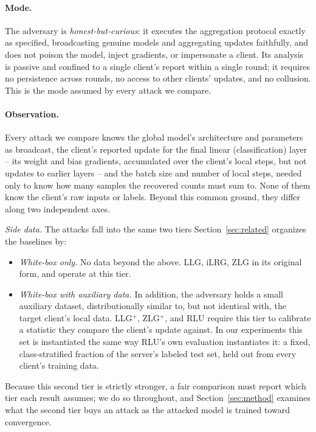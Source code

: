 \paragraph{Mode.}
The adversary is \emph{honest-but-curious}: it executes the aggregation
protocol exactly as specified, broadcasting genuine models and aggregating
updates faithfully, and does not poison the model, inject gradients, or
impersonate a client. Its analysis is passive and confined to a single
client's report within a single round; it requires no persistence across
rounds, no access to other clients' updates, and no collusion. This is the
mode assumed by every attack we compare.

\paragraph{Observation.}
Every attack we compare knows the global model's architecture and
parameters as broadcast, the client's reported update for the final
linear (classification) layer -- its weight and bias gradients,
accumulated over the client's local steps, but not updates to earlier
layers -- and the batch size and number of local steps, needed only to
know how many samples the recovered counts must sum to. None of them
know the client's raw inputs or labels. Beyond this common ground, they
differ along two independent axes.

\emph{Side data.} The attacks fall into the same two tiers
Section~\ref{sec:related} organizes the baselines by:
\begin{itemize}
 \item \emph{White-box only.} No data beyond the above. LLG, iLRG, ZLG in
 its original form, and \ourmethod{} operate at this tier.
 \item \emph{White-box with auxiliary data.} In addition, the adversary
 holds a small auxiliary dataset, distributionally similar to, but not
 identical with, the target client's local data. LLG$^+$, ZLG$^+$, and
 RLU require this tier to calibrate a statistic they compare the
 client's update against. In our experiments this set is instantiated
 the same way RLU's own evaluation instantiates it: a fixed,
 class-stratified fraction of the server's labeled test set, held out
 from every client's training data.
\end{itemize}
Because this second tier is strictly stronger, a fair comparison must
report which tier each result assumes; we do so throughout, and
Section~\ref{sec:method} examines what the second tier buys an attack as
the attacked model is trained toward convergence.

